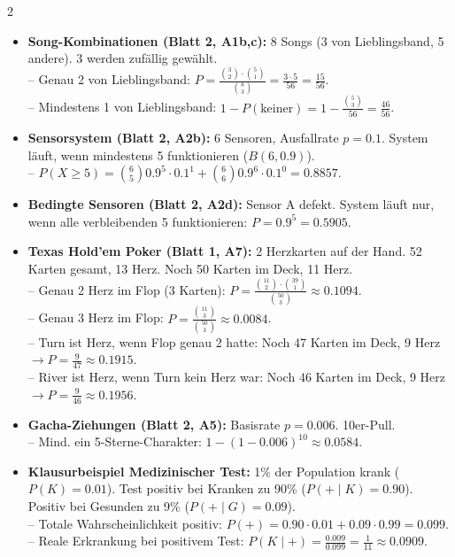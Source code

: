 \documentclass[a4paper, 9pt]{extarticle}
\begin{document}
\begin{multicols*}{2}
\begin{tcolorbox}[title={Übungsblatt-Katalog: Wahrscheinlichkeit}, colframe=probgreen, colback=probgreen!5, colbacktitle=probgreen]
\begin{itemize}
    \item \textbf{Song-Kombinationen (Blatt 2, A1b,c):} 8 Songs (3 von Lieblingsband, 5 andere). 3 werden zufällig gewählt.
    \\-- Genau 2 von Lieblingsband: $P = \frac{\binom{3}{2} \cdot \binom{5}{1}}{\binom{8}{3}} = \frac{3 \cdot 5}{56} = \frac{15}{56}$.
    \\-- Mindestens 1 von Lieblingsband: $1 - P(\text{keiner}) = 1 - \frac{\binom{5}{3}}{56} = \frac{46}{56}$.
    \item \textbf{Sensorsystem (Blatt 2, A2b):} 6 Sensoren, Ausfallrate $p=0.1$. System läuft, wenn mindestens 5 funktionieren ($B(6, 0.9)$).
    \\-- $P(X \ge 5) = \binom{6}{5} 0.9^5 \cdot 0.1^1 + \binom{6}{6} 0.9^6 \cdot 0.1^0 = 0.8857$.
    \item \textbf{Bedingte Sensoren (Blatt 2, A2d):} Sensor A defekt. System läuft nur, wenn alle verbleibenden 5 funktionieren: $P = 0.9^5 = 0.5905$.
    \item \textbf{Texas Hold'em Poker (Blatt 1, A7):} 2 Herzkarten auf der Hand. 52 Karten gesamt, 13 Herz. Noch 50 Karten im Deck, 11 Herz.
    \\-- Genau 2 Herz im Flop (3 Karten): $P = \frac{\binom{11}{2} \cdot \binom{39}{1}}{\binom{50}{3}} \approx 0.1094$.
    \\-- Genau 3 Herz im Flop: $P = \frac{\binom{11}{3}}{\binom{50}{3}} \approx 0.0084$.
    \\-- Turn ist Herz, wenn Flop genau 2 hatte: Noch 47 Karten im Deck, 9 Herz $\rightarrow P = \frac{9}{47} \approx 0.1915$.
    \\-- River ist Herz, wenn Turn kein Herz war: Noch 46 Karten im Deck, 9 Herz $\rightarrow P = \frac{9}{46} \approx 0.1956$.
    \item \textbf{Gacha-Ziehungen (Blatt 2, A5):} Basisrate $p=0.006$. 10er-Pull.
    \\-- Mind. ein 5-Sterne-Charakter: $1 - (1-0.006)^{10} \approx 0.0584$.
    \item \textbf{Klausurbeispiel Medizinischer Test:} 1\% der Population krank ($P(K)=0.01$). Test positiv bei Kranken zu 90\% ($P(+ \mid K)=0.90$). Positiv bei Gesunden zu 9\% ($P(+ \mid G)=0.09$).
    \\-- Totale Wahrscheinlichkeit positiv: $P(+) = 0.90 \cdot 0.01 + 0.09 \cdot 0.99 = 0.099$.
    \\-- Reale Erkrankung bei positivem Test: $P(K \mid +) = \frac{0.009}{0.099} = \frac{1}{11} \approx 0.0909$.
\end{itemize}
\end{tcolorbox}


\end{multicols*}
\end{document}

